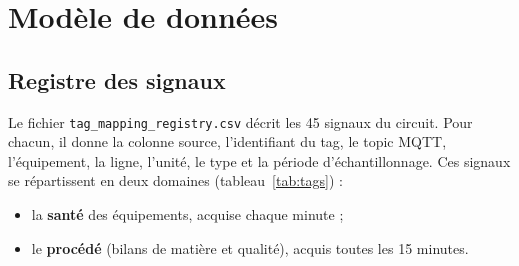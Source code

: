 \section{Modèle de données}

\subsection{Registre des signaux}
Le fichier \texttt{tag\_mapping\_registry.csv} décrit les 45 signaux du circuit. Pour chacun, il donne la colonne source, l'identifiant du tag, le topic MQTT, l'équipement, la ligne, l'unité, le type et la période d'échantillonnage. Ces signaux se répartissent en deux domaines (tableau~\ref{tab:tags}) :
\begin{itemize}
  \item la \textbf{santé} des équipements, acquise chaque minute ;
  \item le \textbf{procédé} (bilans de matière et qualité), acquis toutes les 15 minutes.
\end{itemize}

